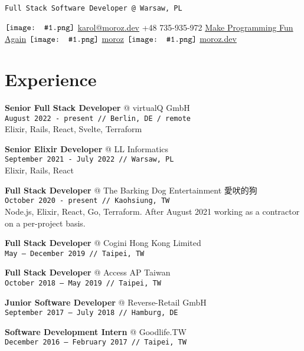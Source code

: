 \documentclass[10pt,a4paper]{article}
\author{Karol Moroz}
\makeatletter
\newcommand{\icon}[1]{$\vcenter{\hbox{\texttt{[image: \#1.png]}}}$\hspace{.2em}}
\newcommand{\experience}[4]{\par\vspace{1em}\textbf{\normalsize #1} {\color{darkgray} @ #2}\\{\footnotesize\texttt{#3 // #4}}\\[4pt]}
\makeatother
\begin{document}
\pagestyle{empty}

\texttt{Full Stack Software Developer @ Warsaw, PL}

\icon{email}
\href{mailto:karol@moroz.dev}{karol@moroz.dev} \hfill
\raisebox{0.15\height}{\icon{telephone}} +48 735-935-972 \hfill
\raisebox{0.15\height}{\icon{youtube}} \href{https://www.youtube.com/channel/UCW_YiVuoo-WG0bxQElVgxAg}{Make Programming Fun Again} \hfill
\icon{github} \href{https://github.com/moroz}{moroz} \hfill
\icon{web} \href{https://moroz.dev}{moroz.dev}

\begin{minipage}[t]{0.67\textwidth}
  \raggedright

  \section{Experience}
  \vspace*{-6pt}

  \experience{Senior Full Stack Developer}{virtualQ GmbH}{August 2022 {-} present}{Berlin, DE / remote}

  Elixir, Rails, React, Svelte, Terraform

  \experience{Senior Elixir Developer}{LL Informatics}{September 2021 {-} July 2022}{Warsaw, PL}

  Elixir, Rails, React

  \experience{Full Stack Developer}{The Barking Dog Entertainment 愛吠的狗}{October 2020 {-} present}{Kaohsiung, TW}

  Node.js, Elixir, React, Go, Terraform. After August 2021 working as a contractor on a per-project basis.

  \experience{Full Stack Developer}{Cogini Hong Kong Limited}{May {–} December 2019}{Taipei, TW}

  \experience{Full Stack Developer}{Access AP Taiwan}{October 2018 {–} May 2019}{Taipei, TW}

  \experience{Junior Software Developer}{Reverse-Retail GmbH}{September 2017 {–} July 2018}{Hamburg, DE}

  \experience{Software Development Intern}{Goodlife.TW}{December 2016 {–} February 2017}{Taipei, TW}
  \vspace{1.2em}
  

\end{minipage}\hspace{0.03\textwidth}%
\end{document}
